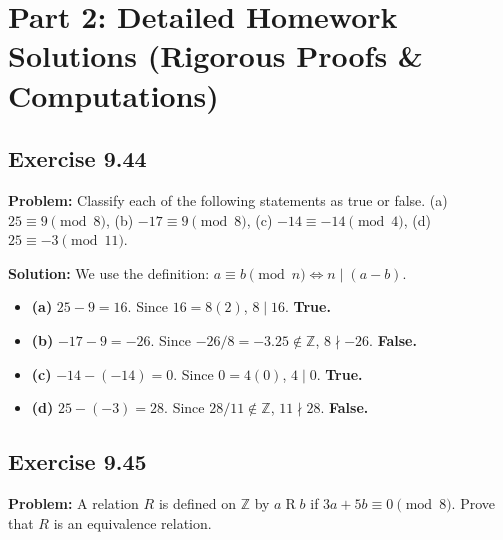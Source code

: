 \documentclass[11pt, a4paper]{article}
\theoremstyle{definition}
\theoremstyle{remark}
\begin{document}
\newpage
\section{Part 2: Detailed Homework Solutions (Rigorous Proofs \& Computations)}

\subsection*{Exercise 9.44}
\textbf{Problem:} Classify each of the following statements as true or false.
(a) $25 \equiv 9 \pmod{8}$, (b) $-17 \equiv 9 \pmod{8}$, (c) $-14 \equiv -14 \pmod{4}$, (d) $25 \equiv -3 \pmod{11}$.

\textbf{Solution:}
We use the definition: $a \equiv b \pmod{n} \iff n \mid (a - b)$.
\begin{itemize}
    \item \textbf{(a)} $25 - 9 = 16$. Since $16 = 8(2)$, $8 \mid 16$. \textbf{True.}
    \item \textbf{(b)} $-17 - 9 = -26$. Since $-26 / 8 = -3.25 \notin \mathbb{Z}$, $8 \nmid -26$. \textbf{False.}
    \item \textbf{(c)} $-14 - (-14) = 0$. Since $0 = 4(0)$, $4 \mid 0$. \textbf{True.}
    \item \textbf{(d)} $25 - (-3) = 28$. Since $28 / 11 \notin \mathbb{Z}$, $11 \nmid 28$. \textbf{False.}
\end{itemize}

\subsection*{Exercise 9.45}
\textbf{Problem:} A relation $R$ is defined on $\mathbb{Z}$ by $a \mathrel{R} b$ if $3a + 5b \equiv 0 \pmod{8}$. Prove that $R$ is an equivalence relation.
\end{document}
